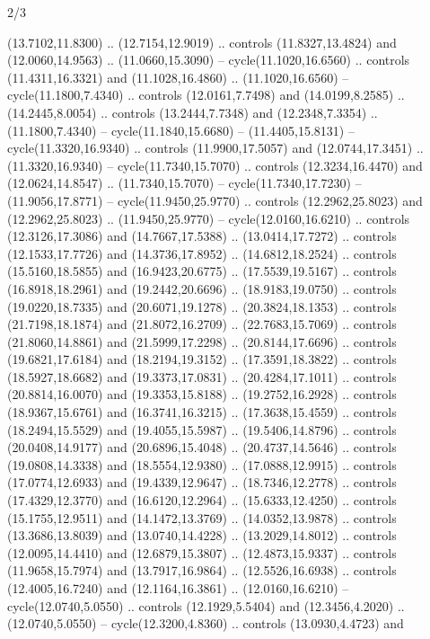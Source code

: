 \begin{flagdescription}{2/3}
\begin{scope}[yshift=\flagwidth,scale=\flagwidth/1241.93737]
\begin{scope}[y=-1mm, x=1mm,draw=gold,fill=blue,line join=miter,miter limit=4,line width=1.8\lw]
\begin{scope}[y=1mm, x=1mm, yscale=-1,shift={(573.68mm+\str,145.75)}]
\begin{scope}[scale=1.35,shift={(-9,-3)}]
\begin{scope}[scale=0.55]
\begin{scope}[scale=1.333]
    (13.7102,11.8300) .. (12.7154,12.9019) .. controls (11.8327,13.4824) and
    (12.0060,14.9563) .. (11.0660,15.3090) -- cycle(11.1020,16.6560) .. controls
    (11.4311,16.3321) and (11.1028,16.4860) .. (11.1020,16.6560) --
    cycle(11.1800,7.4340) .. controls (12.0161,7.7498) and (14.0199,8.2585) ..
    (14.2445,8.0054) .. controls (13.2444,7.7348) and (12.2348,7.3354) ..
    (11.1800,7.4340) -- cycle(11.1840,15.6680) -- (11.4405,15.8131) --
    cycle(11.3320,16.9340) .. controls (11.9900,17.5057) and (12.0744,17.3451) ..
    (11.3320,16.9340) -- cycle(11.7340,15.7070) .. controls (12.3234,16.4470) and
    (12.0624,14.8547) .. (11.7340,15.7070) -- cycle(11.7340,17.7230) --
    (11.9056,17.8771) -- cycle(11.9450,25.9770) .. controls (12.2962,25.8023) and
    (12.2962,25.8023) .. (11.9450,25.9770) -- cycle(12.0160,16.6210) .. controls
    (12.3126,17.3086) and (14.7667,17.5388) .. (13.0414,17.7272) .. controls
    (12.1533,17.7726) and (14.3736,17.8952) .. (14.6812,18.2524) .. controls
    (15.5160,18.5855) and (16.9423,20.6775) .. (17.5539,19.5167) .. controls
    (16.8918,18.2961) and (19.2442,20.6696) .. (18.9183,19.0750) .. controls
    (19.0220,18.7335) and (20.6071,19.1278) .. (20.3824,18.1353) .. controls
    (21.7198,18.1874) and (21.8072,16.2709) .. (22.7683,15.7069) .. controls
    (21.8060,14.8861) and (21.5999,17.2298) .. (20.8144,17.6696) .. controls
    (19.6821,17.6184) and (18.2194,19.3152) .. (17.3591,18.3822) .. controls
    (18.5927,18.6682) and (19.3373,17.0831) .. (20.4284,17.1011) .. controls
    (20.8814,16.0070) and (19.3353,15.8188) .. (19.2752,16.2928) .. controls
    (18.9367,15.6761) and (16.3741,16.3215) .. (17.3638,15.4559) .. controls
    (18.2494,15.5529) and (19.4055,15.5987) .. (19.5406,14.8796) .. controls
    (20.0408,14.9177) and (20.6896,15.4048) .. (20.4737,14.5646) .. controls
    (19.0808,14.3338) and (18.5554,12.9380) .. (17.0888,12.9915) .. controls
    (17.0774,12.6933) and (19.4339,12.9647) .. (18.7346,12.2778) .. controls
    (17.4329,12.3770) and (16.6120,12.2964) .. (15.6333,12.4250) .. controls
    (15.1755,12.9511) and (14.1472,13.3769) .. (14.0352,13.9878) .. controls
    (13.3686,13.8039) and (13.0740,14.4228) .. (13.2029,14.8012) .. controls
    (12.0095,14.4410) and (12.6879,15.3807) .. (12.4873,15.9337) .. controls
    (11.9658,15.7974) and (13.7917,16.9864) .. (12.5526,16.6938) .. controls
    (12.4005,16.7240) and (12.1164,16.3861) .. (12.0160,16.6210) --
    cycle(12.0740,5.0550) .. controls (12.1929,5.5404) and (12.3456,4.2020) ..
    (12.0740,5.0550) -- cycle(12.3200,4.8360) .. controls (13.0930,4.4723) and

\end{scope}
\end{scope}
\end{scope}
\end{scope}
\end{scope}
\end{scope}
\end{flagdescription}
